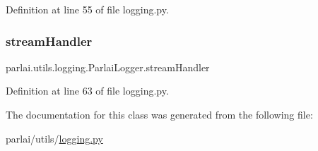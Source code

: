 Definition at line 55 of file logging.\+py.

\mbox{\label{classparlai_1_1utils_1_1logging_1_1ParlaiLogger_a2c40840c6e6fa00eb4cdae9146907b78}} 
\subsubsection{\texorpdfstring{stream\+Handler}{streamHandler}}
{\footnotesize\ttfamily parlai.\+utils.\+logging.\+Parlai\+Logger.\+stream\+Handler}



Definition at line 63 of file logging.\+py.



The documentation for this class was generated from the following file\+:\begin{DoxyCompactItemize}
\item 
parlai/utils/\hyperlink{logging_8py}{logging.\+py}\end{DoxyCompactItemize}
